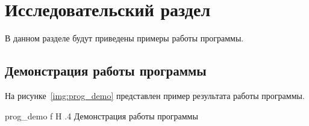 \chapter{Исследовательский раздел}
В данном разделе будут приведены примеры работы программы.

\section{Демонстрация работы программы}
На рисунке~\ref{img:prog_demo} представлен пример результата работы программы.

{prog_demo}
{f}
{H}
{.4\textwidth}
{Демонстрация работы программы}


